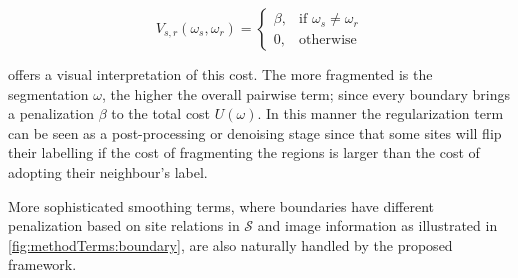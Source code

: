 \begin{equation}
V_{s,r}(\omega_s,\omega_r) = 
\begin{cases}
    \beta, & \text{if } \omega_s \ne \omega_r\\
    0,              & \text{otherwise}
\end{cases}
\label{eq:smoothing}
\end{equation}

 offers a visual interpretation of this cost.
The more fragmented is the segmentation $\omega$, the higher the overall pairwise term; since every boundary brings a penalization $\beta$ to the total cost $U(\omega)$.
In this manner the regularization term can be seen as a post-processing or denoising stage since that some sites will flip their labelling if the cost of fragmenting the regions is larger than the cost of adopting their neighbour's label. 

More sophisticated smoothing terms, where boundaries have different penalization based on site relations in $\mathcal{S}$ and image information as illustrated in \cref{fig:methodTerms:boundary}, are also naturally handled by the proposed framework. %


